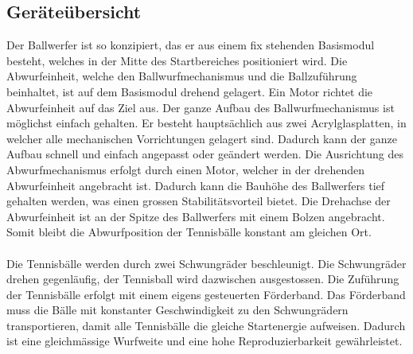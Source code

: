 \subsection{Geräteübersicht}
\label{shap:Geraeteuebersicht}
Der Ballwerfer ist so konzipiert, das er aus einem fix stehenden Basismodul besteht, 
welches in der Mitte des Startbereiches positioniert wird. Die Abwurfeinheit, 
welche den Ballwurfmechanismus und die Ballzuführung beinhaltet, ist auf dem 
Basismodul drehend gelagert. Ein Motor richtet die Abwurfeinheit auf das Ziel aus. 
Der ganze Aufbau des Ballwurfmechanismus ist möglichst einfach gehalten. Er besteht 
hauptsächlich aus zwei Acrylglasplatten, in welcher alle mechanischen Vorrichtungen 
gelagert sind.  Dadurch kann der ganze Aufbau schnell und einfach angepasst oder 
geändert werden. Die Ausrichtung des Abwurfmechanismus erfolgt durch einen Motor, 
welcher in der drehenden Abwurfeinheit angebracht ist. Dadurch kann die Bauhöhe 
des Ballwerfers tief gehalten werden, was einen grossen Stabilitätsvorteil bietet. 
Die Drehachse der Abwurfeinheit ist an der Spitze des Ballwerfers mit einem Bolzen 
angebracht. Somit bleibt die Abwurfposition der Tennisbälle konstant am gleichen Ort.\\
\\
Die Tennisbälle werden durch zwei Schwungräder beschleunigt. Die Schwungräder 
drehen gegenläufig, der Tennisball wird dazwischen ausgestossen. Die Zuführung der 
Tennisbälle erfolgt mit einem eigens gesteuerten Förderband. Das Förderband muss 
die Bälle mit konstanter Geschwindigkeit zu den Schwungrädern transportieren, damit 
alle Tennisbälle die gleiche Startenergie aufweisen. Dadurch ist eine gleichmässige
 Wurfweite und eine hohe Reproduzierbarkeit gewährleistet.
